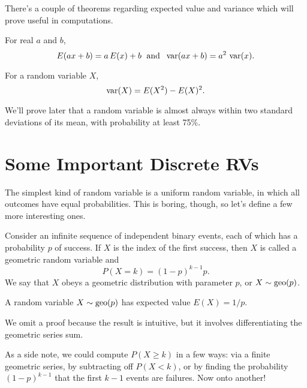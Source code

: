 \documentclass[../m157main.tex]{subfiles}
\begin{document}
There's a couple of theorems regarding expected value and variance which will prove useful in computations.

\begin{theorem}
    For real $a$ and $b$, \vspace{-4pt}
    \[ E(ax + b) = a \,E(x) + b \;\text{ and }\; \operatorname{var}(ax + b) = a^2 \,\operatorname{var}(x). \]
\end{theorem}

\begin{theorem}
    For a random variable $X$, \vspace{-4pt}
    \[ \operatorname{var}(X) = E(X^2) - E(X)^2. \]
\end{theorem}

We'll prove later that a random variable is almost always within two standard deviations of its mean, with probability at least 75\%.

\section{Some Important Discrete RVs}
The simplest kind of random variable is a uniform random variable, in which all outcomes have equal probabilities.
This is boring, though, so let's define a few more interesting ones.

\begin{definition}
    Consider an infinite sequence of independent binary events, each of which has a probability $p$ of success.
    If $X$ is the index of the first success, then $X$ is called a geometric random variable and
    \[ P(X = k) = (1-p)^{k-1} p. \]
    We say that $X$ obeys a geometric distribution with parameter $p$, or $X \sim \operatorname{geo}(p)$.
\end{definition}

\begin{theorem}
    A random variable $X \sim \operatorname{geo}(p)$ has expected value $E(X) = 1 / p$.
\end{theorem}

We omit a proof because the result is intuitive, but it involves differentiating the geometric series sum.

As a side note, we could compute $P(X \geq k)$ in a few ways: via a finite geometric series, by subtracting off $P(X < k)$, or by finding the probability $(1 - p)^{k-1}$ that the first $k-1$ events are failures.
Now onto another!
\end{document}
